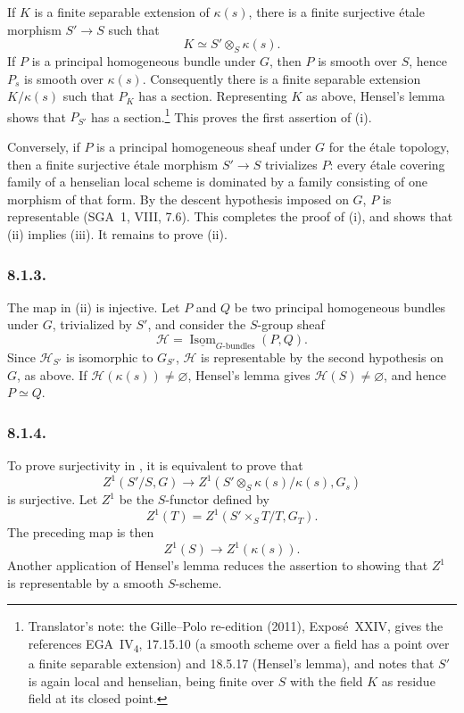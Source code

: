 If \(K\) is a finite separable extension of \(\kappa(s)\), there is a
finite surjective étale morphism \(S'\to S\) such that
\[
  K\simeq S'\otimes_S\kappa(s).
\]
If \(P\) is a principal homogeneous bundle under \(G\), then \(P\) is
smooth over \(S\), hence \(P_s\) is smooth over \(\kappa(s)\).
Consequently there is a finite separable extension \(K/\kappa(s)\)
such that \(P_K\) has a section.
Representing \(K\) as above, Hensel's lemma shows that \(P_{S'}\) has a section.\footnote{Translator's note: the Gille--Polo re-edition (2011), Exposé~XXIV,
gives the references EGA~IV\textsubscript{4}, 17.15.10 (a smooth scheme over a field has a point over a
finite separable extension) and 18.5.17 (Hensel's lemma), and notes that \(S'\) is again local and
henselian, being finite over \(S\) with the field \(K\) as residue field at its closed point.}
This proves the first assertion of (i).

Conversely, if \(P\) is a principal homogeneous sheaf under \(G\) for
the étale topology, then a finite surjective étale morphism
\(S'\to S\) trivializes \(P\): every étale covering family of a
henselian local scheme is dominated by a family consisting of one
morphism of that form. By the descent hypothesis imposed on \(G\),
\(P\) is representable (SGA~1, VIII, 7.6). This completes the proof of
(i), and shows that (ii) implies (iii). It remains to prove (ii).

\subsubsection*{8.1.3.}

The map in (ii) is injective. Let \(P\) and \(Q\) be two principal
homogeneous bundles under \(G\), trivialized by \(S'\), and consider
the \(S\)-group sheaf
\[
  \mathcal H=
  \underline{\operatorname{Isom}}_{G\text{-}\mathrm{bundles}}(P,Q).
\]
Since \(\mathcal H_{S'}\) is isomorphic to \(G_{S'}\),
\(\mathcal H\) is representable by the second hypothesis on \(G\), as
above. If \(\mathcal H(\kappa(s))\neq\varnothing\), Hensel's lemma
gives \(\mathcal H(S)\neq\varnothing\), and hence \(P\simeq Q\).

\subsubsection*{8.1.4.}

To prove surjectivity in , it is equivalent to prove that
\[
  Z^1(S'/S,G)
  \longrightarrow
  Z^1(S'\otimes_S\kappa(s)/\kappa(s),G_s)
\]
is surjective. Let \(Z^1\) be the \(S\)-functor defined by
\[
  Z^1(T)=Z^1(S'\times_ST/T,G_T).
\]
The preceding map is then
\[
  Z^1(S)\longrightarrow Z^1(\kappa(s)).
\]
Another application of Hensel's lemma reduces the assertion to
showing that \(Z^1\) is representable by a smooth \(S\)-scheme.

